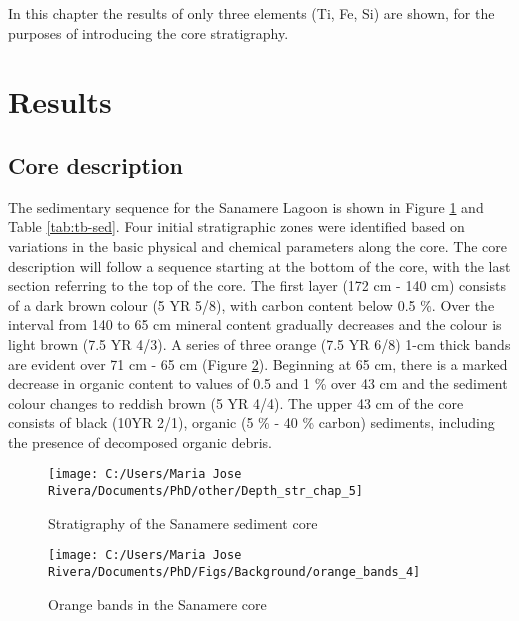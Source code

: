 \documentclass[
  12pt,
]{book}
\begin{document}
In this chapter the results of only three elements (Ti, Fe, Si) are shown, for the purposes of introducing the core stratigraphy.

\hypertarget{results}{%
\section{Results}\label{results}}

\hypertarget{core}{%
\subsection{Core description}\label{core}}

The sedimentary sequence for the Sanamere Lagoon is shown in Figure \ref{fig:fig1} and Table \ref{tab:tb-sed}. Four initial stratigraphic zones were identified based on variations in the basic physical and chemical parameters along the core. The core description will follow a sequence starting at the bottom of the core, with the last section referring to the top of the core. The first layer (172 cm - 140 cm) consists of a dark brown colour (5 YR 5/8), with carbon content below 0.5 \%. Over the interval from 140 to 65 cm mineral content gradually decreases and the colour is light brown (7.5 YR 4/3). A series of three orange (7.5 YR 6/8) 1-cm thick bands are evident over 71 cm - 65 cm (Figure \ref{fig:bands}). Beginning at 65 cm, there is a marked decrease in organic content to values of 0.5 and 1 \% over 43 cm and the sediment colour changes to reddish brown (5 YR 4/4). The upper 43 cm of the core consists of black (10YR 2/1), organic (5 \% - 40 \% carbon) sediments, including the presence of decomposed organic debris.

\begin{figure}

{\centering \texttt{[image: C:/Users/Maria Jose Rivera/Documents/PhD/other/Depth\_str\_chap\_5]} 

}

\caption{Stratigraphy of the Sanamere sediment core}\label{fig:fig1}
\end{figure}



\begin{figure}

{\centering \texttt{[image: C:/Users/Maria Jose Rivera/Documents/PhD/Figs/Background/orange\_bands\_4]} 

}

\caption{Orange bands in the Sanamere core}\label{fig:bands}
\end{figure}
\end{document}

